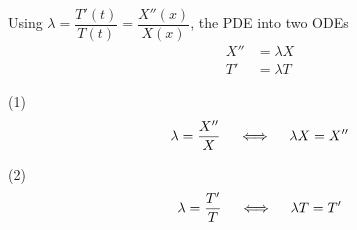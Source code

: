 Using $\lambda = \dfrac{T'(t)}{T(t)} = \dfrac{X''(x)}{X(x)}$,  the PDE into two ODEs
\begin{align*}
    X'' &= \lambda X \tag{1}\\
    T' &= \lambda T \tag{2}
\end{align*}


\soln*

\nl (1) $$\lambda = \frac{X''}{X} \quad\iff\quad \lambda X = X''$$

\noindent (2) $$\lambda = \frac{T'}{T} \quad\iff\quad \lambda T = T'$$